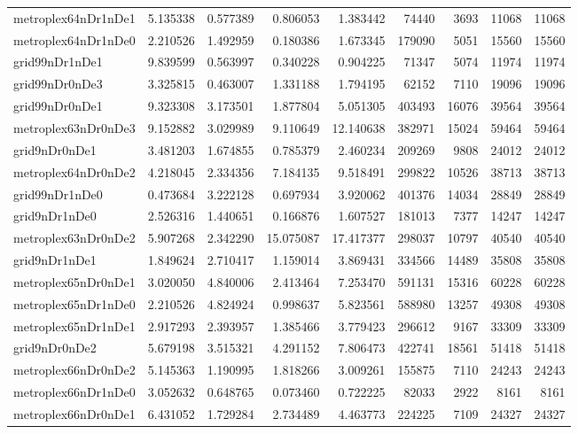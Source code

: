 \documentclass[../../../thesis.tex]{subfiles}
\begin{document}
\begin{longtable}{|l|r|r|r|r|r|r|r|r|}
metroplex64nDr1nDe1 & 5.135338 & 0.577389 & 0.806053 & 1.383442 & 74440 & 3693 & 11068 & 11068 \\
metroplex64nDr1nDe0 & 2.210526 & 1.492959 & 0.180386 & 1.673345 & 179090 & 5051 & 15560 & 15560 \\
grid99nDr1nDe1 & 9.839599 & 0.563997 & 0.340228 & 0.904225 & 71347 & 5074 & 11974 & 11974 \\
grid99nDr0nDe3 & 3.325815 & 0.463007 & 1.331188 & 1.794195 & 62152 & 7110 & 19096 & 19096 \\
grid99nDr0nDe1 & 9.323308 & 3.173501 & 1.877804 & 5.051305 & 403493 & 16076 & 39564 & 39564 \\
metroplex63nDr0nDe3 & 9.152882 & 3.029989 & 9.110649 & 12.140638 & 382971 & 15024 & 59464 & 59464 \\
grid9nDr0nDe1 & 3.481203 & 1.674855 & 0.785379 & 2.460234 & 209269 & 9808 & 24012 & 24012 \\
metroplex64nDr0nDe2 & 4.218045 & 2.334356 & 7.184135 & 9.518491 & 299822 & 10526 & 38713 & 38713 \\
grid99nDr1nDe0 & 0.473684 & 3.222128 & 0.697934 & 3.920062 & 401376 & 14034 & 28849 & 28849 \\
grid9nDr1nDe0 & 2.526316 & 1.440651 & 0.166876 & 1.607527 & 181013 & 7377 & 14247 & 14247 \\
metroplex63nDr0nDe2 & 5.907268 & 2.342290 & 15.075087 & 17.417377 & 298037 & 10797 & 40540 & 40540 \\
grid9nDr1nDe1 & 1.849624 & 2.710417 & 1.159014 & 3.869431 & 334566 & 14489 & 35808 & 35808 \\
metroplex65nDr0nDe1 & 3.020050 & 4.840006 & 2.413464 & 7.253470 & 591131 & 15316 & 60228 & 60228 \\
metroplex65nDr1nDe0 & 2.210526 & 4.824924 & 0.998637 & 5.823561 & 588980 & 13257 & 49308 & 49308 \\
metroplex65nDr1nDe1 & 2.917293 & 2.393957 & 1.385466 & 3.779423 & 296612 & 9167 & 33309 & 33309 \\
grid9nDr0nDe2 & 5.679198 & 3.515321 & 4.291152 & 7.806473 & 422741 & 18561 & 51418 & 51418 \\
metroplex66nDr0nDe2 & 5.145363 & 1.190995 & 1.818266 & 3.009261 & 155875 & 7110 & 24243 & 24243 \\
metroplex66nDr1nDe0 & 3.052632 & 0.648765 & 0.073460 & 0.722225 & 82033 & 2922 & 8161 & 8161 \\
metroplex66nDr0nDe1 & 6.431052 & 1.729284 & 2.734489 & 4.463773 & 224225 & 7109 & 24327 & 24327 \\

\end{longtable}
\end{document}
